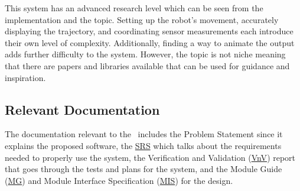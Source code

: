 \documentclass[12pt, titlepage]{article}
\begin{document}
This system has an advanced research level which can be seen from the implementation and the topic. Setting up the robot’s movement, accurately displaying the trajectory, and coordinating sensor measurements each introduce their own level of complexity. Additionally, finding a way to animate the output adds further difficulty to the system. However, the topic is not niche meaning that there are papers and libraries available that can be used for guidance and inspiration.



\subsection{Relevant Documentation}




The documentation relevant to the \progname~includes the Problem Statement since it explains the proposed software, the \href{https://github.com/AliyahJimoh/2D-Localizer/blob/main/docs/SRS/SRS.pdf}{SRS} which talks about the requirements needed to properly use the system, the Verification and Validation (\href{https://github.com/AliyahJimoh/2D-Localizer/blob/main/docs/VnVReport/VnVReport.pdf}{VnV}) report that goes through the tests and plans for the system, and the Module Guide (\href{https://github.com/AliyahJimoh/2D-Localizer/blob/main/docs/Design/SoftArchitecture/MG.pdf}{MG}) and Module Interface Specification (\href{https://github.com/AliyahJimoh/2D-Localizer/blob/main/docs/Design/SoftDetailedDes/MIS.pdf}{MIS}) for the design.
\end{document}

